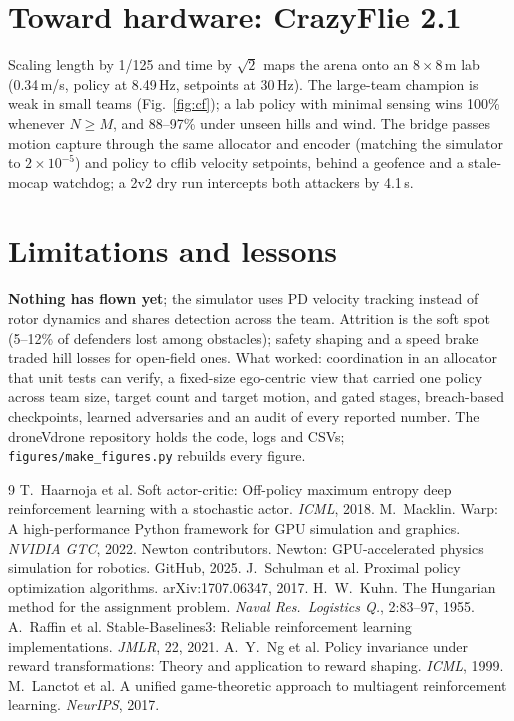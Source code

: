 \documentclass[10pt,twocolumn]{article}
\begin{document}
\section{Toward hardware: CrazyFlie 2.1}


Scaling length by 1/125 and time by $\sqrt{2}$ maps the arena onto an 8\,$\times$\,8\,m lab (0.34\,m/s, policy at
8.49\,Hz, setpoints at 30\,Hz). The large-team champion is weak in small teams (Fig.~\ref{fig:cf}); a lab policy with
minimal sensing wins 100\% whenever $N\geq M$, and 88--97\% under unseen hills and wind. The bridge passes motion capture
through the same allocator and encoder (matching the simulator to $2{\times}10^{-5}$) and policy to cflib
velocity setpoints, behind a geofence and a stale-mocap watchdog; a 2v2 dry run intercepts both attackers by 4.1\,s.

\section{Limitations and lessons}

\textbf{Nothing has flown yet}; the simulator uses PD velocity tracking instead of rotor dynamics and shares detection
across the team. Attrition is the soft spot (5--12\% of defenders lost among obstacles); safety shaping and a speed brake traded hill losses for open-field ones. What worked: coordination in an
allocator that unit tests can verify, a fixed-size ego-centric view that carried one policy across team size, target
count and target motion, and gated stages, breach-based checkpoints, learned adversaries and an audit of every reported
number. The droneVdrone repository holds the code, logs and CSVs; \texttt{figures/make\_figures.py} rebuilds every figure.

\begin{thebibliography}{9}\scriptsize
\setlength{\itemsep}{0pt}\setlength{\parsep}{0pt}\setlength{\topsep}{1pt}
 T.~Haarnoja et al. Soft actor-critic: Off-policy maximum entropy deep reinforcement learning with a
stochastic actor. \emph{ICML}, 2018.
 M.~Macklin. Warp: A high-performance Python framework for GPU simulation and graphics. \emph{NVIDIA GTC},
2022.
 Newton contributors. Newton: GPU-accelerated physics simulation for robotics. GitHub, 2025.
 J.~Schulman et al. Proximal policy optimization algorithms. arXiv:1707.06347, 2017.
 H.~W.~Kuhn. The Hungarian method for the assignment problem. \emph{Naval Res.\ Logistics Q.}, 2:83--97,
1955.
 A.~Raffin et al. Stable-Baselines3: Reliable reinforcement learning implementations. \emph{JMLR}, 22, 2021.
 A.~Y.~Ng et al. Policy invariance under reward transformations: Theory and application to reward shaping.
\emph{ICML}, 1999.
 M.~Lanctot et al. A unified game-theoretic approach to multiagent reinforcement learning. \emph{NeurIPS},
2017.
\end{thebibliography}
\end{document}
